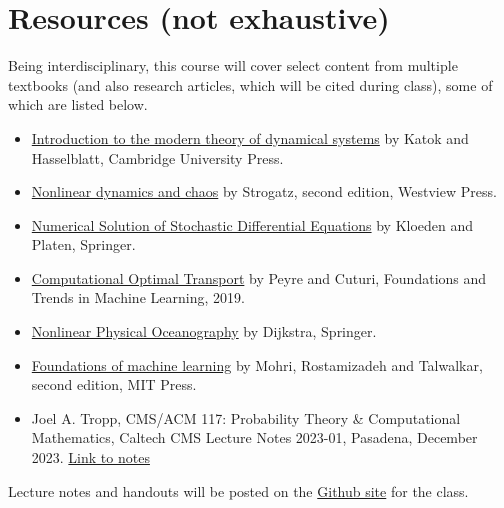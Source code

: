 \documentclass[12pt]{article}
\begin{document}
\section{Resources (not exhaustive)}
\label{sec:resources}
Being interdisciplinary, this course will cover select content from multiple textbooks (and also research articles, which will be cited during class), some of which are listed below. 
\begin{itemize}
	\item 
		\href{https://books.google.com/books?hl=en&lr=&id=9nL7ZX8Djp4C&oi=fnd&pg=PR7&dq=katok+and+hasselblatt&ots=oWieU2cCAH&sig=T-g4-msNhCCTTpoSyMb09ZhnF2Y#v=onepage&q=katok%20and%20hasselblatt&f=false}{Introduction to the modern theory of dynamical systems} by Katok and Hasselblatt, Cambridge University Press.
	\item  \href{https://books.google.com/books?hl=en&lr=&id=wUBvDwAAQBAJ&oi=fnd&pg=PT7&ots=AOtaTsiIyX&sig=MexxyAiFbXhsxZNKq6V7YLjjv5w#v=onepage&q&f=false}{Nonlinear dynamics and chaos} by Strogatz, second edition, Westview Press.
	\item \href{https://link.springer.com/book/10.1007/978-3-662-12616-5}{Numerical Solution of Stochastic Differential Equations} by Kloeden and Platen, Springer. 

	\item \href{https://www.nowpublishers.com/article/Details/MAL-073}{Computational Optimal Transport} by Peyre and Cuturi, Foundations and Trends in Machine Learning, 2019.
	\item \href{https://books.google.com/books?hl=en&lr=&id=vaFKLXvfSaUC&oi=fnd&pg=PR9&dq=henk+dijkstra&ots=DCHHbStuIf&sig=ibiNU5CqYdT-Fo37v1FUIpuLs1o#v=onepage&q=henk%20dijkstra&f=false}{Nonlinear Physical Oceanography} by Dijkstra, Springer.	
	\item \href{https://books.google.com/books?hl=en&lr=&id=dWB9DwAAQBAJ&oi=fnd&pg=PR5&dq=foundations+of+machine+learning+mohri&ots=AznTXOq_s4&sig=oFBecq2rS2nusMY-xRj1qD-0Dsk#v=onepage&q=foundations%20of%20machine%20learning%20mohri&f=false}{Foundations of machine learning} by Mohri, Rostamizadeh and Talwalkar, second edition, MIT Press.
	\item Joel A. Tropp, CMS/ACM 117: Probability Theory \& Computational Mathematics,
Caltech CMS Lecture Notes 2023-01, Pasadena, December 2023. \href{https://doi.org/10.7907/q75sz-e1e79}{Link to notes}
	
\end{itemize}
Lecture notes and handouts will be posted on the \href{https://github.com/ni-sha-c/ComputationalDynamics-Spring24}{Github site} for the class.
\end{document}
